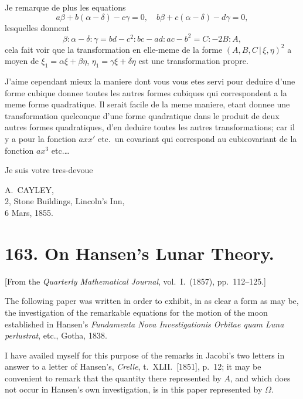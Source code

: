 \documentclass[12pt,a4paper]{article}
\theoremstyle{plain}
\begin{document}
Je remarque de plus les equations
\[
a\beta + b(\alpha-\delta) - c\gamma = 0, \quad b\beta + c(\alpha-\delta) - d\gamma = 0,
\]
lesquelles donnent
\[
\beta : \alpha-\delta : \gamma = bd-c^2 : bc-ad : ac-b^2 = C : -2B : A,
\]
cela fait voir que la transformation en elle-meme de la forme $(A,B,C \,|\, \xi,\eta)^2$ a moyen de $\xi_1 = \alpha\xi + \beta\eta$, $\eta_1 = \gamma\xi + \delta\eta$ est une transformation propre.

J'aime cependant mieux la maniere dont vous vous etes servi pour deduire d'une forme cubique donnee toutes les autres formes cubiques qui correspondent a la meme forme quadratique. Il serait facile de la meme maniere, etant donnee une transformation quelconque d'une forme quadratique dans le produit de deux autres formes quadratiques, d'en deduire toutes les autres transformations; car il y a pour la fonction $axx'$ etc.\ un covariant qui correspond au cubicovariant de la fonction $ax^3$ etc.\ldots

Je suis votre tres-devoue

\begin{flushright}
A.~CAYLEY,\\
2, Stone Buildings, Lincoln's Inn,\\
6 Mars, 1855.
\end{flushright}

\clearpage

\section*{163. On Hansen's Lunar Theory.}

[From the \textit{Quarterly Mathematical Journal}, vol.~I.\ (1857), pp.~112--125.]

The following paper was written in order to exhibit, in as clear a form as may be, the investigation of the remarkable equations for the motion of the moon established in Hansen's \textit{Fundamenta Nova Investigationis Orbitae quam Luna perlustrat}, etc., Gotha, 1838.

I have availed myself for this purpose of the remarks in Jacobi's two letters in answer to a letter of Hansen's, \textit{Crelle}, t.~XLII.\ [1851], p.~12; it may be convenient to remark that the quantity there represented by $A$, and which does not occur in Hansen's own investigation, is in this paper represented by $\Omega$.
\end{document}
